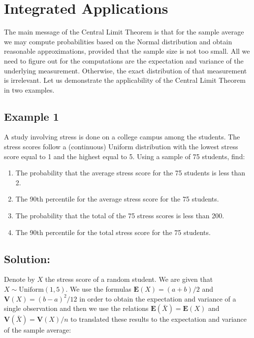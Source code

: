 \documentclass[
]{krantz}
\newcommand{\Expec}{\mathbf{E}}
\newcommand{\Var}{\mathbf{V}}
\theoremstyle{definition}
\theoremstyle{definition}
\theoremstyle{definition}
\theoremstyle{remark}
\begin{document}
\hypertarget{integrated-applications}{%
\section{Integrated Applications}\label{integrated-applications}}

The main message of the Central Limit Theorem is that for the sample
average we may compute probabilities based on the Normal distribution
and obtain reasonable approximations, provided that the sample size is
not too small. All we need to figure out for the computations are the
expectation and variance of the underlying measurement. Otherwise, the
exact distribution of that measurement is irrelevant. Let us demonstrate
the applicability of the Central Limit Theorem in two examples.

\hypertarget{example-1}{%
\subsection{Example 1}\label{example-1}}

A study involving stress is done on a college campus among the students.
The stress scores follow a (continuous) Uniform distribution with the
lowest stress score equal to 1 and the highest equal to 5. Using a
sample of 75 students, find:

\begin{enumerate}
\def\labelenumi{\arabic{enumi}.}
\item
  The probability that the average stress score for the 75 students is
  less than 2.
\item
  The 90th percentile for the average stress score for the 75
  students.
\item
  The probability that the total of the 75 stress scores is less
  than 200.
\item
  The 90th percentile for the total stress score for the 75 students.
\end{enumerate}

\hypertarget{solution}{%
\subsection*{Solution:}\label{solution}}


Denote by \(X\) the stress score of a random student. We are given that
\(X \sim \mathrm{Uniform}(1,5)\). We use the formulas
\(\Expec(X) = (a+b)/2\) and \(\Var(X) = (b-a)^2/12\) in order to obtain the
expectation and variance of a single observation and then we use the
relations \(\Expec(\bar X) = \Expec(X)\) and \(\Var(\bar X) = \Var(X)/n\) to
translated these results to the expectation and variance of the sample
average:
\end{document}
